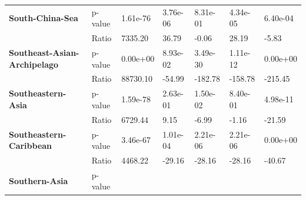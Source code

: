 \begin{table}[H]
{\begin{tabular}{lllllll}
            \textbf{South-China-Sea}                            & p-value  &
            1.61e-76                                            & 3.76e-06 &
            8.31e-01                                            & 4.34e-05 &
            6.40e-04
            \\
            \textbf{}                                           & Ratio    &
            7335.20                                             & 36.79    &
            -0.06
                                                                & 28.19    &
            -5.83
            \\
            \textbf{Southeast-Asian-Archipelago}                & p-value  &
            0.00e+00                                            & 8.93e-02 &
            3.49e-30                                            & 1.11e-12 &
            0.00e+00
            \\
            \textbf{}                                           & Ratio    &
            88730.10                                            & -54.99   &
            -182.78
                                                                & -158.78  &
            -215.45
            \\
            \textbf{Southeastern-Asia}                          & p-value  &
            1.59e-78                                            & 2.63e-01 &
            1.50e-02                                            & 8.40e-01 &
            4.98e-11
            \\
            \textbf{}                                           & Ratio    &
            6729.44                                             & 9.15     &
            -6.99
                                                                & -1.16    &
            -21.59
            \\
            \textbf{Southeastern-Caribbean}                     & p-value  &
            3.46e-67                                            & 1.01e-04 &
            2.21e-06                                            & 2.21e-06 &
            0.00e+00
            \\
            \textbf{}                                           & Ratio    &
            4468.22                                             & -29.16   &
            -28.16
                                                                & -28.16   &
            -40.67
            \\
            \textbf{Southern-Asia}                              & p-value  &

\end{tabular}}
\end{table}
